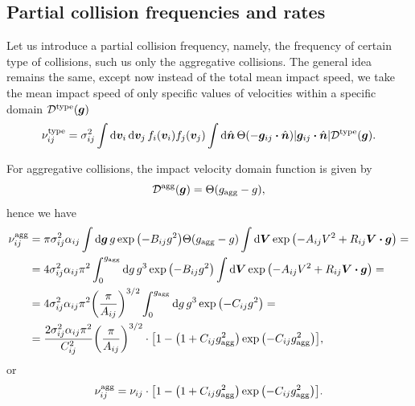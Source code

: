 \documentclass[aps,prl,preprint,groupedaddress,10pt]{revtex4-2}
\begin{document}
\subsection{Partial collision frequencies and rates}
Let us introduce a partial collision frequency, namely, the frequency of certain type of
collisions, such us only the aggregative collisions. The general idea remains the same, except now
instead of the total mean impact speed, we take the mean impact speed of only specific values of
velocities within a specific domain $\mathcal{D}^{\mathrm{type}}(\vb*{g})$
\begin{equation}
    \utx{\nu_{ij}}{type}=\sigma_{ij}^2\int\dd{\bv_i}\dd{\bv_j}f_i(\bv_i)f_j(\bv_j)
    \int\dd{\bn}\Theta\pqty{-\bg_{ij}\vdot\bn}\abs{\bg_{ij}\vdot\bn}\utx{\mathcal{D}}{type}(\bg).
\end{equation}

For aggregative collisions, the impact velocity domain function is given by
\begin{equation}
    \utx{\mathcal{D}}{agg}(\bg)=\Theta\pqty{\ltx{g}{agg}-g},
\end{equation}
hence we have
\begin{equation}
    \begin{split}
        \utx{\nu_{ij}}{agg}&=\pi\sigma_{ij}^2\alpha_{ij}\int\dd{\bg} g\exp\pqty{-B_{ij}g^2}
        \Theta\pqty{\ltx{g}{agg}-g}\int\dd{\bV}\exp\pqty{-A_{ij}V^2+R_{ij}\bV\vdot\bg}=\\
        &=4\sigma_{ij}^2\alpha_{ij}\pi^2\int_{0}^{\ltx{g}{agg}}\dd{g}g^3\exp\pqty{-B_{ij}g^2}
        \int\dd{\bV}\exp\pqty{-A_{ij}V^2+R_{ij}\bV\vdot\bg}=\\
        &=4\sigma_{ij}^2\alpha_{ij}\pi^2\pqty{\frac{\pi}{A_{ij}}}^{3/2}
        \int_{0}^{\ltx{g}{agg}}\dd{g}g^3\exp\pqty{-C_{ij}g^2}=\\
        &=\frac{2\sigma_{ij}^2\alpha_{ij}\pi^2}{C_{ij}^2}\pqty{\frac{\pi}{A_{ij}}}^{3/2}\cdot
        \bqty{1-\pqty{1+C_{ij}\ltx{g}{agg}^2}\exp\pqty{-C_{ij}\ltx{g}{agg}^2}},
    \end{split}
\end{equation}
or
\begin{equation}
    \utx{\nu_{ij}}{agg}=\nu_{ij}\cdot\bqty{1-\pqty{1+C_{ij}\ltx{g}{agg}^2}\exp\pqty{-C_{ij}\ltx{g}{agg}^2}}.
\end{equation}
\end{document}
